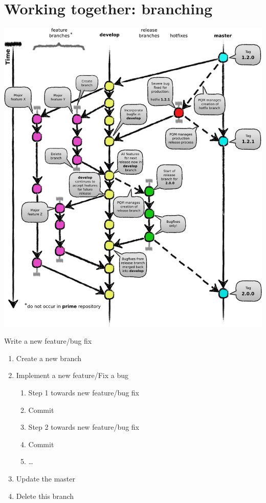 

\section{Working together: branching}

\begin{frame}
\includegraphics[height=0.9\textheight, width=\textwidth]{images/gitflow}
\end{frame}

\begin{frame}[fragile]{Write a new feature/bug fix}
	\begin{enumerate}
		\item Create a new branch
		\item Implement a new feature/Fix a bug
		\begin{enumerate}
			\item Step 1 towards new feature/bug fix
			\item Commit
			\item Step 2 towards new feature/bug fix
			\item Commit
			\item \ldots
		\end{enumerate}
		\item Update the master
		\item Delete this branch 
	\end{enumerate}
\end{frame}

